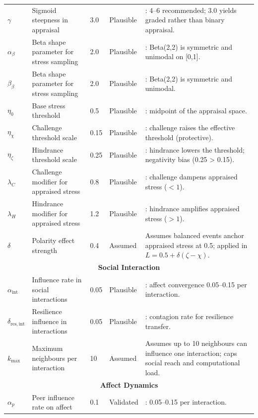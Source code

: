 \documentclass[
  letterpaper,
  DIV=11,
  numbers=noendperiod]{scrartcl}
\begin{document}
\begin{longtable}{lp{2.4cm}p{1.6cm}p{1.7cm}p{5.2cm}}
$\gamma$ & Sigmoid steepness in appraisal & 3.0 & Plausible & \cite{cavanaugh2000}: 4--6 recommended; 3.0 yields graded rather than binary appraisal. \\
$\alpha_\beta$ & Beta shape parameter for stress sampling & 2.0 & Plausible & \cite{folkman2020stress}: Beta(2,2) is symmetric and unimodal on [0,1]. \\
$\beta_\beta$ & Beta shape parameter for stress sampling & 2.0 & Plausible & \cite{folkman2020stress}: Beta(2,2) is symmetric and unimodal. \\
$\eta_0$ & Base stress threshold & 0.5 & Plausible & \cite{cavanaugh2000}: midpoint of the appraisal space. \\
$\eta_{\chi}$ & Challenge threshold scale & 0.15 & Plausible & \cite{cavanaugh2000}: challenge raises the effective threshold (protective). \\
$\eta_{\zeta}$ & Hindrance threshold scale & 0.25 & Plausible & \cite{podsakoff2007}: hindrance lowers the threshold; negativity bias (0.25 > 0.15). \\
$\lambda_C$ & Challenge modifier for appraised stress & 0.8 & Plausible & \cite{cavanaugh2000}: challenge dampens appraised stress ($<1$). \\
$\lambda_H$ & Hindrance modifier for appraised stress & 1.2 & Plausible & \cite{cavanaugh2000}: hindrance amplifies appraised stress ($>1$). \\
$\delta$ & Polarity effect strength & 0.4 & Assumed & Assumes balanced events anchor appraised stress at 0.5; applied in $L = 0.5 + \delta(\zeta - \chi)$. \\
\midrule
\multicolumn{5}{c}{\textbf{Social Interaction}} \\
\midrule
$\alpha_{\mathrm{int}}$ & Influence rate in social interactions & 0.05 & Plausible & \cite{Boomgaard2018}: affect convergence 0.05--0.15 per interaction. \\
$\delta_{\mathrm{res,int}}$ & Resilience influence in interactions & 0.05 & Plausible & \cite{Boomgaard2018}: contagion rate for resilience transfer. \\
$k_{\max}$ & Maximum neighbours per interaction & 10 & Assumed & Assumes up to 10 neighbours can influence one interaction; caps social reach and computational load. \\
\midrule
\multicolumn{5}{c}{\textbf{Affect Dynamics}} \\
\midrule
$\alpha_p$ & Peer influence rate on affect & 0.1 & Validated & \cite{Boomgaard2018}: 0.05--0.15 per interaction. \\

\end{longtable}
\end{document}
